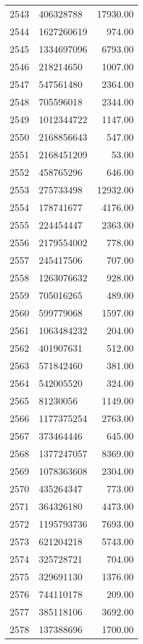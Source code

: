 \begin{table}[ht]
\begin{tabular}{rlr}
  2543 & 406328788 & 17930.00 \\ 
  2544 & 1627260619 & 974.00 \\ 
  2545 & 1334697096 & 6793.00 \\ 
  2546 & 218214650 & 1007.00 \\ 
  2547 & 547561480 & 2364.00 \\ 
  2548 & 705596018 & 2344.00 \\ 
  2549 & 1012344722 & 1147.00 \\ 
  2550 & 2168856643 & 547.00 \\ 
  2551 & 2168451209 & 53.00 \\ 
  2552 & 458765296 & 646.00 \\ 
  2553 & 275733498 & 12932.00 \\ 
  2554 & 178741677 & 4176.00 \\ 
  2555 & 224454447 & 2363.00 \\ 
  2556 & 2179554002 & 778.00 \\ 
  2557 & 245417506 & 707.00 \\ 
  2558 & 1263076632 & 928.00 \\ 
  2559 & 705016265 & 489.00 \\ 
  2560 & 599779068 & 1597.00 \\ 
  2561 & 1063484232 & 204.00 \\ 
  2562 & 401907631 & 512.00 \\ 
  2563 & 571842460 & 381.00 \\ 
  2564 & 542005520 & 324.00 \\ 
  2565 & 81230056 & 1149.00 \\ 
  2566 & 1177375254 & 2763.00 \\ 
  2567 & 373464446 & 645.00 \\ 
  2568 & 1377247057 & 8369.00 \\ 
  2569 & 1078363608 & 2304.00 \\ 
  2570 & 435264347 & 773.00 \\ 
  2571 & 364326180 & 4473.00 \\ 
  2572 & 1195793736 & 7693.00 \\ 
  2573 & 621204218 & 5743.00 \\ 
  2574 & 325728721 & 704.00 \\ 
  2575 & 329691130 & 1376.00 \\ 
  2576 & 744110178 & 209.00 \\ 
  2577 & 385118106 & 3692.00 \\ 
  2578 & 137388696 & 1700.00 \\ 

\end{tabular}
\end{table}
